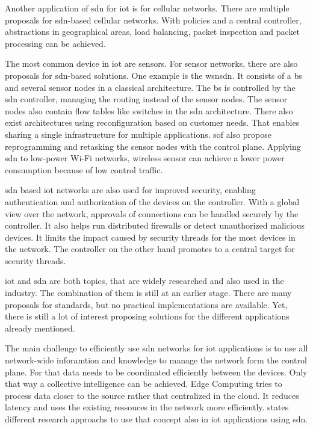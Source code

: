 \documentclass[conference]{IEEEtran}
\begin{document}
	Another application of \ac{sdn} for \ac{iot} is for cellular networks. There are multiple proposals for \ac{sdn}-based cellular networks. With policies and a central controller, abstractions in geographical areas, load balancing, packet inspection and packet processing can be achieved. \cite{Sahrish2017}

	The most common device in \ac{iot} are sensors. For sensor networks, there are also proposals for \ac{sdn}-based solutions. One example is the \ac{wsnsdn}. It consists of a \ac{bs} and several sensor nodes in a classical architecture. The \ac{bs} is controlled by the \ac{sdn} controller, managing the routing instead of the sensor nodes. The sensor nodes also contain flow tables like switches in the \ac{sdn} architecture. \cite{Sahrish2017} There also exist architectures using reconfiguration based on customer needs. That enables sharing a single infrastructure for multiple applications. \ac{sof} also propose reprogramming and retasking the sensor nodes with the control plane. \cite{Li2020-lx} Applying \ac{sdn} to low-power Wi-Fi networks, wireless sensor can achieve a lower power consumption because of low control traffic. \cite{Manguri2022-vp}

	\ac{sdn} based \ac{iot} networks are also used for improved security, enabling authentication and authorization of the devices on the controller. With a global view over the network, approvals of connections can be handled securely by the controller. It also helps run distributed firewalls or detect unauthorized malicious devices. \cite{Sahrish2017} It limits the impact caused by security threads for the most devices in the network. The controller on the other hand promotes to a central target for security threads. \cite{Li2020-lx}

	\ac{iot} and \ac{sdn} are both topics, that are widely researched and also used in the industry. The combination of them is still at an earlier stage. There are many proposals for standards, but no practical implementations are available. Yet, there is still a lot of interest proposing solutions for the different applications already mentioned. \cite{Manguri2022-vp} 

	The main challenge to efficiently use \ac{sdn} networks for \ac{iot} applications is to use all network-wide inforamtion and knowledge to manage the network form the control plane. For that data needs to be coordinated efficiently between the devices. Only that way a collective intelligence can be achieved. Edge Computing tries to process data closer to the source rather that centralized in the cloud. It reduces latency and uses the existing ressouces in the network more efficiently. \cite{edge-computing} \citeauthor{Li2020-lx} states different research approachs to use that concept also in \ac{iot} applications using \ac{sdn}. 
\end{document}
